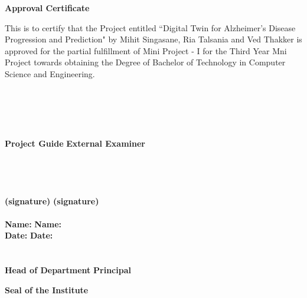 \newpage
\thispagestyle{empty}
\vspace*{0.2cm}
\vspace{1cm}
\begin{center}
 \large\textbf{Approval Certificate}
\end{center}
\vspace{2cm}
This is to certify that the Project entitled ``Digital Twin for Alzheimer’s Disease Progression and Prediction" by Mihit Singasane, Ria Talsania and Ved Thakker is approved  for the partial fulfillment of Mini Project - I for the Third Year Mni Project towards obtaining the Degree of Bachelor of Technology in Computer Science and Engineering.\\
\\
\\
\\
\\
\\
\textbf{Project Guide} \hspace{3.5in} \textbf{External Examiner}\\ 
\\
\\
\\
\\
\textbf {(signature)} \hspace{3.75in} \textbf{(signature)} \\
\\
\vspace{1cm}
\textbf {Name:} \hspace{4.1in} \textbf{Name:}\\ 
\vspace{1cm}
\textbf {Date:} \hspace{4.2in} \textbf{Date:}\\ 
\vspace{1cm}
\\
\\
\textbf {Head of Department} \hspace{3in} \textbf{Principal}\\ 
\vspace{2cm}
\begin{center}
\textbf{Seal of the Institute}\\
\end{center}

